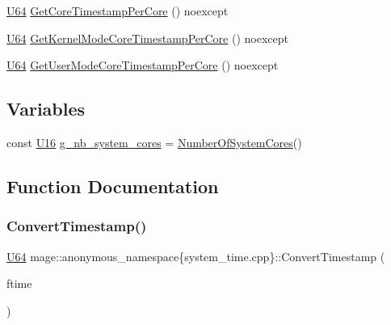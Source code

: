 \begin{DoxyCompactItemize}
\mbox{\hyperlink{namespacemage_ae0ad2dd0035dba92ed0f2e84c182b03b}{U64}} \mbox{\hyperlink{namespacemage_1_1anonymous__namespace_02system__time_8cpp_03_ab1a6d7a9936cb74fd15d489f4212762b}{Get\+Core\+Timestamp\+Per\+Core}} () noexcept
\item 
\mbox{\hyperlink{namespacemage_ae0ad2dd0035dba92ed0f2e84c182b03b}{U64}} \mbox{\hyperlink{namespacemage_1_1anonymous__namespace_02system__time_8cpp_03_afc730fda25530d33c1887b9ad44d04e9}{Get\+Kernel\+Mode\+Core\+Timestamp\+Per\+Core}} () noexcept
\item 
\mbox{\hyperlink{namespacemage_ae0ad2dd0035dba92ed0f2e84c182b03b}{U64}} \mbox{\hyperlink{namespacemage_1_1anonymous__namespace_02system__time_8cpp_03_a50f87297a0ecbde94ac88a35416c6add}{Get\+User\+Mode\+Core\+Timestamp\+Per\+Core}} () noexcept
\end{DoxyCompactItemize}
\subsection*{Variables}
\begin{DoxyCompactItemize}
\item 
const \mbox{\hyperlink{namespacemage_a1701f09b2c3ed62768e1b7d00bf30d0b}{U16}} \mbox{\hyperlink{namespacemage_1_1anonymous__namespace_02system__time_8cpp_03_aeb32807843c4f0be48e5af90ccc9a870}{g\+\_\+nb\+\_\+system\+\_\+cores}} = \mbox{\hyperlink{namespacemage_a825ee5d6ce6db3c24967af86ed40edd4}{Number\+Of\+System\+Cores}}()
\end{DoxyCompactItemize}


\subsection{Function Documentation}
\mbox{\label{namespacemage_1_1anonymous__namespace_02system__time_8cpp_03_ac1448a2c7b4dc5805087ff492ef7015c}} 
\subsubsection{\texorpdfstring{Convert\+Timestamp()}{ConvertTimestamp()}}
{\footnotesize\ttfamily \mbox{\hyperlink{namespacemage_ae0ad2dd0035dba92ed0f2e84c182b03b}{U64}} mage\+::anonymous\+\_\+namespace\{system\+\_\+time.\+cpp\}\+::Convert\+Timestamp (\begin{DoxyParamCaption}\item[{const F\+I\+L\+E\+T\+I\+ME \&}]{ftime }\end{DoxyParamCaption})\hspace{0.3cm}{\ttfamily [noexcept]}}

